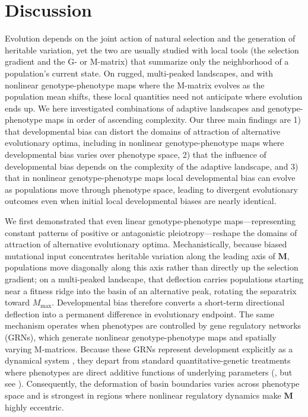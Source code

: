 \section{Discussion} \label{discussion}

Evolution depends on the joint action of natural selection and the generation of heritable variation, yet the two are usually studied with local tools (the selection gradient and the G- or M-matrix) that summarize only the neighborhood of a population's current state.
On rugged, multi-peaked landscapes, and with nonlinear genotype-phenotype maps where the M-matrix evolves as the population mean shifts, these local quantities need not anticipate where evolution ends up.
We here investigated combinations of adaptive landscapes and genotype-phenotype maps in order of ascending complexity.
Our three main findings are 1) that developmental bias can distort the domains of attraction of alternative evolutionary optima, including in nonlinear genotype-phenotype maps where developmental bias varies over phenotype space, 2) that the influence of developmental bias depends on the complexity of the adaptive landscape, and 3) that in nonlinear genotype-phenotype maps local developmental bias can evolve as populations move through phenotype space, leading to divergent evolutionary outcomes even when initial local developmental biases are nearly identical.

We first demonstrated that even linear genotype-phenotype maps—representing constant patterns of positive or antagonistic pleiotropy—reshape the domains of attraction of alternative evolutionary optima.
Mechanistically, because biased mutational input concentrates heritable variation along the leading axis of $\mathbf{M}$, populations move diagonally along this axis rather than directly up the selection gradient; on a multi-peaked landscape, that deflection carries populations starting near a fitness ridge into the basin of an alternative peak, rotating the separatrix toward $M_{\max}$.
Developmental bias therefore converts a short-term directional deflection into a permanent difference in evolutionary endpoint.
The same mechanism operates when phenotypes are controlled by gene regulatory networks (GRNs), which generate nonlinear genotype-phenotype maps and spatially varying M-matrices.
Because these GRNs represent development explicitly as a dynamical system \parencite{jaeger2014bioattractors, milocco2024utilizing}, they depart from standard quantitative-genetic treatments where phenotypes are direct additive functions of underlying parameters (\cite{Arnold2008-pc, jones2007mutation,Jones2014-wj,jiang2025alternative}, but see \cite{gjuvsland2007statistical, hether2014genetic}).
Consequently, the deformation of basin boundaries varies across phenotype space and is strongest in regions where nonlinear regulatory dynamics make $\mathbf{M}$ highly eccentric.
 
